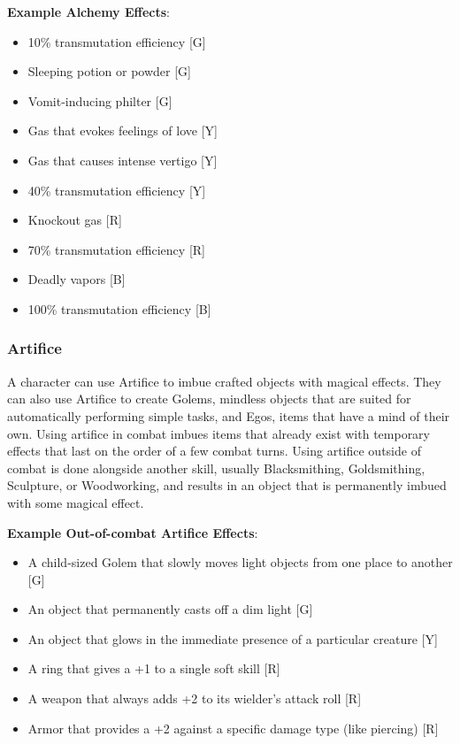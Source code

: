 \documentclass[oneside]{book}
\begin{document}
\begin{multicols}{2}
\textbf{Example Alchemy Effects}: 
	\begin{itemize}
		\setlength{\itemsep}{0cm}%
  		\setlength{\parskip}{0cm}%
		\item{ \small 10\% transmutation efficiency [G]}
		\item{ \small Sleeping potion or powder [G]}
		\item{ \small Vomit-inducing philter [G]}
		\item{ \small Gas that evokes feelings of love [Y]}
		\item{ \small Gas that causes intense vertigo [Y]}
		\item{ \small 40\% transmutation efficiency [Y]}
		\item{ \small Knockout gas [R]}
		\item{ \small 70\% transmutation efficiency [R]}
		\item{ \small Deadly vapors [B]}
		\item{ \small 100\% transmutation efficiency [B]}
	\end{itemize}

\subsubsection{Artifice}
A character can use Artifice to imbue crafted objects with magical effects. They can also use Artifice to create Golems, mindless objects that are suited for automatically performing simple tasks, and Egos, items that have a mind of their own. Using artifice in combat imbues items that already exist with temporary effects that last on the order of a few combat turns. Using artifice outside of combat is done alongside another skill, usually Blacksmithing, Goldsmithing, Sculpture, or Woodworking, and results in an object that is permanently imbued with some magical effect.

\textbf{Example Out-of-combat Artifice Effects}: 
	\begin{itemize}
		\setlength{\itemsep}{0cm}%
  		\setlength{\parskip}{0cm}%
		\item{ \small A child-sized Golem that slowly moves light objects from one place to another [G]}
		\item{ \small An object that permanently casts off a dim light [G]}
		\item{ \small An object that glows in the immediate presence of a particular creature [Y]}
		\item{ \small A ring that gives a +1 to a single soft skill [R]}
		\item{ \small A weapon that always adds +2 to its wielder's attack roll [R]}
		\item{ \small Armor that provides a +2 against a specific damage type (like piercing) [R]}
	\end{itemize}


\end{multicols}
\end{document}
